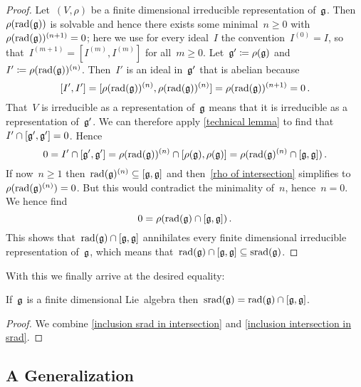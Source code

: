 \begin{proof}
  Let~$(V, \rho)$ be a finite dimensional irreducible representation of~$\mathfrak{g}$.
  Then~$\rho(\operatorname{rad}(\mathfrak{g}))$ is solvable and hence there exists some minimal~$n \geq 0$ with~$\rho(\operatorname{rad}(\mathfrak{g}))^{(n+1)} = 0$;
  here we use for every ideal~$I$ the convention~$I^{(0)} = I$, so that~$I^{(m+1)} = [I^{(m)}, I^{(m)}]$ for all~$m \geq 0$.
  Let~$\mathfrak{g}' \coloneqq \rho(\mathfrak{g})$ and~$I' \coloneqq \rho(\operatorname{rad}(\mathfrak{g}))^{(n)}$.
  Then~$I'$ is an ideal in~$\mathfrak{g}'$ that is abelian because
  \[
    [I', I']
    =
    [\rho(\operatorname{rad}(\mathfrak{g}))^{(n)}, \rho(\operatorname{rad}(\mathfrak{g}))^{(n)}]
    =
    \rho(\operatorname{rad}(\mathfrak{g}))^{(n+1)}
    =
    0 \,.
  \]
  That~$V$ is irreducible as a representation of~$\mathfrak{g}$ means that it is irreducible as a representation of~$\mathfrak{g}'$.
  We can therefore apply \cref{technical lemma} to find that~$I' \cap [\mathfrak{g}', \mathfrak{g}'] = 0$.
  Hence
  \begin{equation}
    \label{rho of intersection}
    0
    =
    I' \cap [\mathfrak{g}', \mathfrak{g}']
    =
    \rho(\operatorname{rad}(\mathfrak{g}))^{(n)} \cap [\rho(\mathfrak{g}), \rho(\mathfrak{g})]
    =
    \rho( \operatorname{rad}(\mathfrak{g})^{(n)} \cap [\mathfrak{g}, \mathfrak{g}] ) \,.
  \end{equation}
  If now~$n \geq 1$ then~$\operatorname{rad}(\mathfrak{g})^{(n)} \subseteq [\mathfrak{g}, \mathfrak{g}]$ and then~\eqref{rho of intersection} simplifies to~$\rho( \operatorname{rad}(\mathfrak{g})^{(n)} ) = 0$.
  But this would contradict the minimality of~$n$, hence~$n = 0$.
  We hence find
  \[
    0
    =
    \rho( \operatorname{rad}(\mathfrak{g}) \cap [\mathfrak{g}, \mathfrak{g}] ) \,.
  \]
  This shows that~$\operatorname{rad}(\mathfrak{g}) \cap [\mathfrak{g}, \mathfrak{g}]$ annihilates every finite dimensional irreducible representation of~$\mathfrak{g}$, which means that~$\operatorname{rad}(\mathfrak{g}) \cap [\mathfrak{g}, \mathfrak{g}] \subseteq \operatorname{srad}(\mathfrak{g})$.
\end{proof}

With this we finally arrive at the desired equality:

\begin{theorem}
  If~$\mathfrak{g}$ is a finite dimensional Lie~algebra then~$\operatorname{srad}(\mathfrak{g}) = \operatorname{rad}(\mathfrak{g}) \cap [\mathfrak{g}, \mathfrak{g}]$.
\end{theorem}

\begin{proof}
  We combine \cref{inclusion srad in intersection} and \cref{inclusion intersection in srad}.
\end{proof}





\subsection*{A Generalization}

